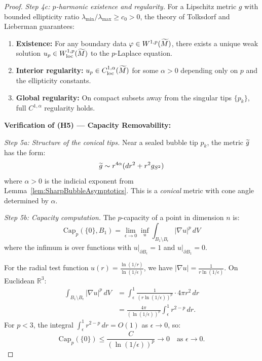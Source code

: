 \begin{proof}
\textit{Step 4c: $p$-harmonic existence and regularity.}
For a Lipschitz metric $g$ with bounded ellipticity ratio $\lambda_{\min} / \lambda_{\max} \ge c_0 > 0$, the theory of Tolksdorf \cite{tolksdorf1984} and Lieberman \cite{lieberman1988} guarantees:
\begin{enumerate}
    \item \textbf{Existence:} For any boundary data $\varphi \in W^{1,p}(\widetilde{M})$, there exists a unique weak solution $u_p \in W^{1,p}_{\mathrm{loc}}(\widetilde{M})$ to the $p$-Laplace equation.
    \item \textbf{Interior regularity:} $u_p \in C^{1,\alpha}_{\mathrm{loc}}(\widetilde{M})$ for some $\alpha > 0$ depending only on $p$ and the ellipticity constants.
    \item \textbf{Global regularity:} On compact subsets away from the singular tips $\{p_k\}$, full $C^{1,\alpha}$ regularity holds.
\end{enumerate}

\textbf{Verification of (H5) --- Capacity Removability:}

\textit{Step 5a: Structure of the conical tips.}
Near a sealed bubble tip $p_k$, the metric $\widetilde{g}$ has the form:
\begin{equation}
    \widetilde{g} \sim r^{4\alpha} (dr^2 + r^2 g_{S^2})
\end{equation}
where $\alpha > 0$ is the indicial exponent from Lemma~\ref{lem:SharpBubbleAsymptotics}. This is a \emph{conical} metric with cone angle determined by $\alpha$.

\textit{Step 5b: Capacity computation.}
The $p$-capacity of a point in dimension $n$ is:
\begin{equation}
    \mathrm{Cap}_p(\{0\}, B_1) = \lim_{\epsilon \to 0} \inf_{u} \int_{B_1 \setminus B_\epsilon} |\nabla u|^p \, dV
\end{equation}
where the infimum is over functions with $u|_{\partial B_\epsilon} = 1$ and $u|_{\partial B_1} = 0$.

For the radial test function $u(r) = \frac{\ln(1/r)}{\ln(1/\epsilon)}$, we have $|\nabla u| = \frac{1}{r \ln(1/\epsilon)}$. On Euclidean $\mathbb{R}^3$:
\begin{align*}
    \int_{B_1 \setminus B_\epsilon} |\nabla u|^p \, dV &= \int_\epsilon^1 \frac{1}{(r \ln(1/\epsilon))^p} \cdot 4\pi r^2 \, dr \\
    &= \frac{4\pi}{(\ln(1/\epsilon))^p} \int_\epsilon^1 r^{2-p} \, dr.
\end{align*}
For $p < 3$, the integral $\int_\epsilon^1 r^{2-p} \, dr = O(1)$ as $\epsilon \to 0$, so:
\begin{equation}
    \mathrm{Cap}_p(\{0\}) \le \frac{C}{(\ln(1/\epsilon))^p} \to 0 \quad \text{as } \epsilon \to 0.
\end{equation}


\end{proof}
